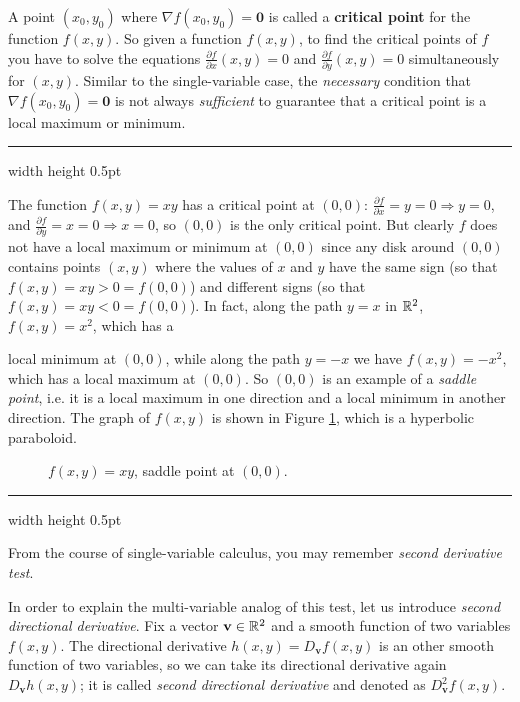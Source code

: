 A point $(x_0,y_0)$ where $\nabla f (x_0,y_0) = \mathbf{0}$ is called a \textbf{critical point} for the function $f(x,y)$.
So given a function $f(x,y)$, to find the critical points of $f$ you have to solve the equations
$\frac{\partial f}{\partial x}(x,y) = 0$ and $\frac{\partial f}{\partial y}(x,y) = 0$ simultaneously for $(x,y)$.
Similar to the single-variable case, the \emph{necessary} condition that $\nabla f (x_0,y_0) = \mathbf{0}$ is not always
\emph{sufficient} to guarantee that a critical point is a local maximum or minimum.

\medskip
\hrule width \textwidth height 0.5pt
\begin{exmp}
 The function $f(x,y) = xy$ has a critical point at $(0,0)$: $\frac{\partial f}{\partial x} = y = 0 \Rightarrow y=0$,
 and $\frac{\partial f}{\partial y} = x = 0 \Rightarrow x=0$, so $(0,0)$ is the only critical point. But clearly $f$
 does not have a local maximum or minimum at $(0,0)$ since any disk around $(0,0)$ contains points $(x,y)$ where the
 values of $x$ and $y$ have the same sign (so that $f(x,y) = xy > 0 = f(0,0)$) and different signs (so that $f(x,y) =
 xy < 0 = f(0,0)$). In fact, along the path $y=x$ in $\mathbb{R}^{2}$, $f(x,y) = x^2$, which has a

\noindent local minimum at $(0,0)$,
 while along the path $y=-x$ we have $f(x,y)=-x^2$, which has a local maximum at $(0,0)$. So $(0,0)$ is an example of a
 \emph{saddle point}, i.e. it is a local maximum in one direction and a local minimum in another direction. The graph
 of $f(x,y)$ is shown in Figure \ref{fig:xy}, which is a hyperbolic paraboloid.
\end{exmp}
\begin{figure}[h]
 \begin{center}
  
 \end{center}
 \caption[]{\quad $f(x,y) = xy$, saddle point at $(0,0)$.}
 \label{fig:xy}
\end{figure}
\hrule width \textwidth height 0.5pt

\medskip

From the course of single-variable calculus, you may remember \emph{second derivative test}.


In order to explain the multi-variable analog of this test,
let us introduce \emph{second directional derivative}. 
Fix a vector $\mathbf{v}\in\mathbb{R}^{2}$ and a smooth function of two variables $f(x,y)$.
The directional derivative $h(x,y)=D_{\mathbf{v}}f(x,y)$ is an other smooth function of two variables, so we can take its directional derivative again 
$D_{\mathbf{v}}h(x,y)$;
it is called \emph{second directional derivative} and denoted as $D_{\mathbf{v}}^2f(x,y)$.

